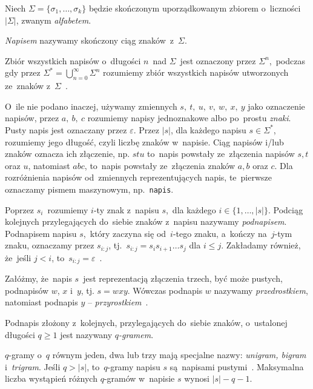 \documentclass{praca1}
\begin{document}
Niech  $\Sigma = \{\sigma_1, \ldots, \sigma_k\}$ będzie skończonym uporządkowanym zbiorem o~liczności $|\Sigma|$, zwanym \emph{alfabetem}.

\begin{definition}
\emph{Napisem} nazywamy skończony ciąg znaków~z~$\Sigma$.
\end{definition}

Zbiór wszystkich napisów o~długości $n$~nad $\Sigma$~jest oznaczony przez $\Sigma^n$,~podczas gdy przez $\Sigma^* = \bigcup_{n=0}^{\infty}\Sigma^n$ rozumiemy zbiór wszystkich napisów utworzonych ze~znaków z~$\Sigma$~\cite{Boytsov2011:indexingmethods}.

O~ile nie podano inaczej, używamy zmiennych $s,\ t,\ u,\ v,\ w,\ x,\ y$ jako oznaczenie napisów, przez $a,\ b,\ c$ rozumiemy napisy jednoznakowe albo po~prostu \emph{znaki}. Pusty napis jest oznaczany przez $\varepsilon$. Przez $|s|$, dla każdego napisu $s \in \Sigma^*$, rozumiemy jego długość, czyli liczbę znaków w~napisie. Ciąg napisów i/lub znaków oznacza ich złączenie, np. $stu$ to~napis powstały ze~złączenia napisów $s, t$ oraz $u$, natomiast $abc$, to~napis powstały ze~złączenia znaków $a, b$ oraz $c$. Dla rozróżnienia napisów od~zmiennych reprezentujących napis, te~pierwsze oznaczamy pismem maszynowym, np.~\verb|napis|.

Poprzez $s_i$~rozumiemy $i$-ty znak z~napisu $s$,~dla każdego $i \in \{1,\ldots,|s|\}$. Podciąg kolejnych przylegających do~siebie znaków z~napisu nazywamy \emph{podnapisem}. Podnapisem napisu $s$,~który zaczyna się od~$i$-tego znaku, a~kończy na~$j$-tym znaku, oznaczamy przez $s_{i:j}$, tj.~$s_{i:j} = s_is_{i+1}\ldots s_j$ dla $i \leq j$. Zakładamy również, że~jeśli $j < i$, to~$s_{i:j} = \varepsilon$~\cite{Boytsov2011:indexingmethods,Loo2014:stringdist}.

\begin{definition}
Załóżmy, że~napis $s$~jest reprezentacją złączenia trzech, być może pustych, podnapisów $w$, $x$ i~$y$, tj. $s = wxy$. Wówczas podnapis $w$ nazywamy \emph{przedrostkiem}, natomiast podnapis $y$ -- \emph{przyrostkiem}~\cite{Boytsov2011:indexingmethods}.
\end{definition}

\begin{definition}
Podnapis złożony z~kolejnych, przylegających do~siebie znaków, o~ustalonej długości $q\geq 1$ jest nazywany \emph{$q$-gramem}.
\end{definition}

$q$-gramy o~$q$ równym jeden, dwa lub trzy mają specjalne nazwy: \emph{unigram, bigram} i~\emph{trigram}. Jeśli $q > |s|$, to~$q$-gramy napisu $s$ są~napisami pustymi~\cite{Boytsov2011:indexingmethods}. Maksymalna liczba wystąpień różnych $q$-gramów w~napisie $s$ wynosi $|s|-q-1$.
\end{document}
